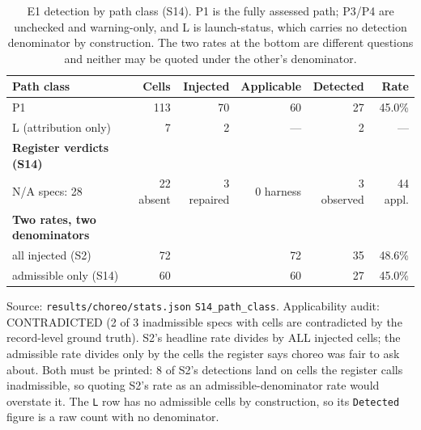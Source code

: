 \begin{table}[t]
\centering\footnotesize
\caption{E1 detection by path class (S14). P1 is the fully assessed path; P3/P4 are unchecked and warning-only, and L is launch-status, which carries no detection denominator by construction. The two rates at the bottom are different questions and neither may be quoted under the other's denominator.}
\label{tab:e1-path-class}
\begin{tabular}{@{}lrrrrr@{}}
\toprule
Path class & Cells & Injected & Applicable & Detected & Rate \\
\midrule
P1 & 113 & 70 & 60 & 27 & 45.0\% \\
L (attribution only) & 7 & 2 & --- & 2 & --- \\
\textbf{Register verdicts (S14)} &  &  &  &  &  \\
N/A specs: 28 & 22 absent & 3 repaired & 0 harness & 3 observed & 44 appl. \\
\textbf{Two rates, two denominators} &  &  &  &  &  \\
all injected (S2) & 72 &  & 72 & 35 & 48.6\% \\
admissible only (S14) & 60 &  & 60 & 27 & 45.0\% \\
\bottomrule
\end{tabular}
\vspace{0.4em}\begin{minipage}{0.98\linewidth}\raggedright\footnotesize Source: \texttt{results/choreo/stats.json} \texttt{S14\_path\_class}. Applicability audit: CONTRADICTED (2 of 3 inadmissible specs with cells are contradicted by the record-level ground truth). S2's headline rate divides by ALL injected cells; the admissible rate divides only by the cells the register says choreo was fair to ask about. Both must be printed: 8 of S2's detections land on cells the register calls inadmissible, so quoting S2's rate as an admissible-denominator rate would overstate it. The \texttt{L} row has no admissible cells by construction, so its \texttt{Detected} figure is a raw count with no denominator. \end{minipage}
\end{table}
